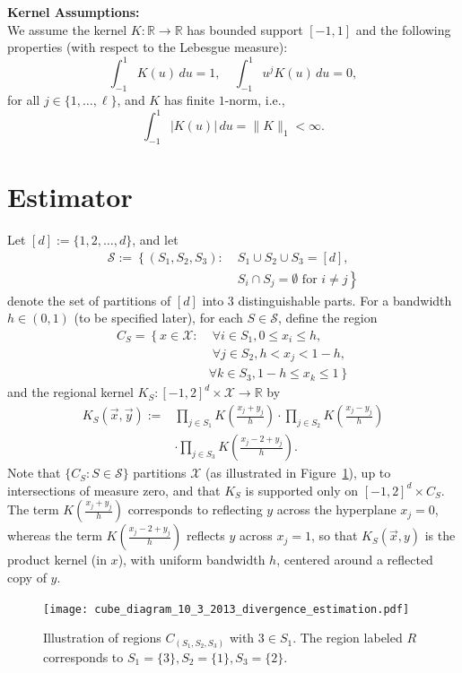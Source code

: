 \documentclass{article}
\newcommand{\R}{\mathbb{R}}                         %
\newcommand{\Se}{\mathcal{S}}                       %
\newcommand{\X}{\mathcal{X}}                        %
\newcommand{\vx}{\vec{x}}                           %
\newcommand{\vy}{\vec{y}}                           %
\begin{document}
{\bf Kernel Assumptions:}\\
We assume the kernel $K : \R \to \R$ has bounded support
$[-1,1]$ and the following properties (with respect to the Lebesgue measure):
\[\int_{-1}^1 K(u) \, du = 1, \quad \int_{-1}^1 u^jK(u) \, du = 0,
\]
for all $j \in \{1,\dots,\ell\}$, and $K$ has finite $1$-norm, i.e.,
\begin{equation}
\label{eq:k_int}
    \int_{-1}^1 |K(u)| \, du = \|K\|_1 < \infty.
\end{equation}

\section{Estimator} \label{sec:estimator}
Let $[d] := \{1,2,\ldots,d\}$, and let
\begin{align*}
\Se := \left\{ (S_1,S_2,S_3) \right. : \; & S_1 \cup S_2 \cup S_3 = [d], \\
& \left. S_i \cap S_j = \emptyset \mbox{ for } i \neq j \right\}
\end{align*}
denote the set of partitions of $[d]$ into $3$ distinguishable parts. For a
bandwidth $h \in (0,1)$ (to be specified later), for each $S \in \Se$, define
the region
\begin{align*}
C_S = \left\{x \in \X : \right.
      &   \;\forall i \in S_1, 0 \leq x_i \leq h, \\
      &   \;\forall j \in S_2, h < x_j < 1 - h,   \\
      &   \left. \forall k \in S_3, 1 - h \leq x_k \leq 1 \right\}
\end{align*}
and the regional kernel $K_S : [-1,2]^d \times \X \to \R$ by
\begin{align*}
K_S(\vx,\vy) :=
 &          \prod_{j \in S_1} K \left(\frac{x_j + y_j}{h}\right)
    \cdot   \prod_{j \in S_2} K \left(\frac{x_j - y_j}{h}\right)  \\
 &  \cdot   \prod_{j \in S_3} K \left(\frac{x_j - 2 + y_j}{h}\right).
\end{align*}
Note that $\{C_S : S \in \Se\}$ partitions $\X$ (as illustrated in
Figure~\ref{fig:cube}), up to intersections of measure zero, and that $K_S$ is
supported only on $[-1,2]^d \times C_S$. The term
$K \left( \frac{x_j + y_j}{h} \right)$ corresponds to reflecting $y$ across the
hyperplane $x_j = 0$, whereas the term $K \left(\frac{x_j - 2 + y_j}{h}\right)$
reflects $y$ across $x_j = 1$, so that $K_S(\vx,y)$ is the product kernel (in
$x$), with uniform bandwidth $h$, centered around a reflected copy of $y$.
\begin{figure}[h!]
\begin{center}
\texttt{[image: cube\_diagram\_10\_3\_2013\_divergence\_estimation.pdf]}
\end{center}
\vspace{-3mm}
\caption{Illustration of regions $C_{(S_1,S_2,S_3)}$ with $3 \in S_1$. The
region labeled $R$ corresponds to $S_1 = \{3\},S_2 = \{1\},S_3 = \{2\}$.}
\label{fig:cube}
\end{figure}
\end{document}
